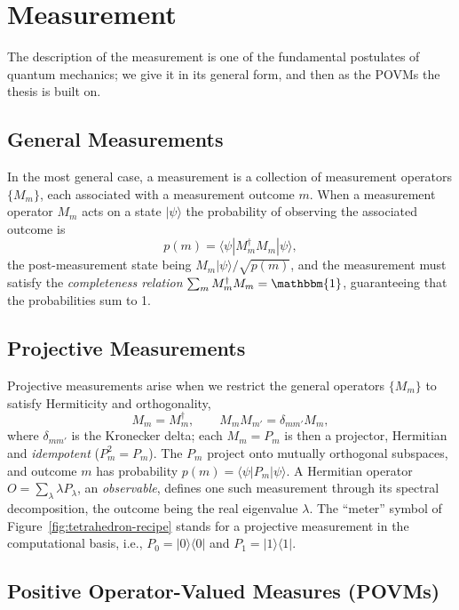 \documentclass[11pt, oneside, openany]{scrbook}
\newcommand{\Id}{\mathbbm{1}}
\newcommand{\ket}[1]{|#1\rangle}
\newcommand{\bra}[1]{\langle#1|}
\newcommand{\ketbra}[2]{|#1\rangle\langle#2|}
\begin{document}
\section{Measurement} \label{sec:measurement}

The description of the measurement is one of the fundamental postulates of quantum mechanics; we give it in its general form, and then as the POVMs the thesis is built on.

\subsection{General Measurements}

In the most general case, a measurement is a collection of measurement operators $\{M_m\}$, each associated with a measurement outcome $m$. When a measurement operator $M_m$ acts on a state $\ket{\psi}$ the probability of observing the associated outcome is $$p(m) = \bra{\psi}M_m^\dagger M_m \ket{\psi},$$ the post-measurement state being $M_m \ket{\psi} / \sqrt{p(m)}$, and the measurement must satisfy the \textit{completeness relation} $\sum_m{M_m^\dagger M_m} = \Id$, guaranteeing that the probabilities sum to 1.

\subsection{Projective Measurements}

Projective measurements arise when we restrict the general operators $\{M_m\}$ to satisfy Hermiticity and orthogonality,
\[
    M_m = M_m^\dagger, \qquad M_m M_{m'} = \delta_{mm'} M_m,
\]
where $\delta_{mm'}$ is the Kronecker delta; each $M_m = P_m$ is then a projector, Hermitian and \textit{idempotent} ($P_m^2 = P_m$). The $P_m$ project onto mutually orthogonal subspaces, and outcome $m$ has probability $p(m) = \bra{\psi} P_m \ket{\psi}$. A Hermitian operator $O = \sum_\lambda \lambda P_\lambda$, an \textit{observable}, defines one such measurement through its spectral decomposition, the outcome being the real eigenvalue $\lambda$. The ``meter'' symbol of Figure~\ref{fig:tetrahedron-recipe} stands for a projective measurement in the computational basis, i.e., $P_0 = \ketbra{0}{0}$ and $P_1 = \ketbra{1}{1}$.

\subsection{Positive Operator-Valued Measures (POVMs)}
\end{document}
